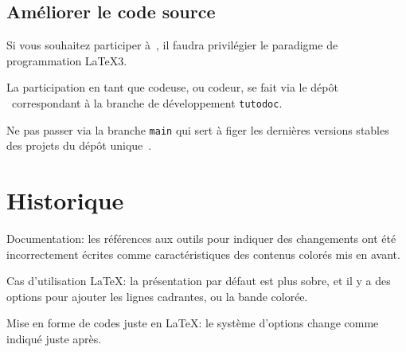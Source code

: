
\subsection{Améliorer le code source}

\begin{tdocimp}
    Si vous souhaitez participer à \thisproj\,, il faudra privilégier le paradigme de programmation \LaTeX3.
\end{tdocimp}


La participation en tant que codeuse, ou codeur, se fait via le dépôt \thisrepo\ correspondant à la branche de développement \verb#tutodoc#.


\begin{tdoccaut}
	Ne pas passer via la branche \verb#main# qui sert à figer les dernières versions stables des projets du dépôt unique \thismonorepo\,.
\end{tdoccaut}


\section{Historique}

\small

\begin{tdocfix}[version = 1.7.1, date = 2024-12-17]
	\item Documentation: les références aux outils pour indiquer des changements ont été incorrectement écrites comme caractéristiques des contenus colorés mis en avant.
\end{tdocfix}


\begin{tdocbreak}
	\item Cas d'utilisation \LaTeX: la présentation par défaut est plus sobre, et il y a des options pour ajouter les lignes cadrantes, ou la bande colorée.

	\item Mise en forme de codes juste en \LaTeX: le système d'options change comme indiqué juste après.
\end{tdocbreak}


